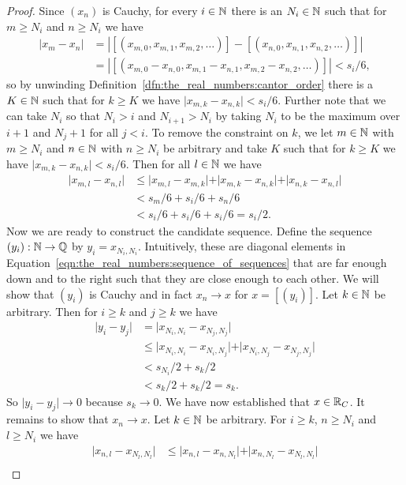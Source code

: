 \documentclass[../main.tex]{subfiles}
\begin{document}
\begin{proof}
    Since $(x_n)$ is Cauchy, for every $i\in\mathbb{N}$ there is an $N_i\in\mathbb{N}$ such that for $m\geq N_i$ and $n\geq N_i$ we have
    \begin{align*}
        \vert x_m-x_n\vert & =\left\vert[(x_{m,0},x_{m,1},x_{m,2},\dots)]-[(x_{n,0},x_{n,1},x_{n,2},\dots)]\right\vert \\
        & =\left\vert[(x_{m,0}-x_{n,0},x_{m,1}-x_{n,1},x_{m,2}-x_{n,2},\dots)]\right\vert<s_i/6,
    \end{align*}
    so by unwinding Definition~\ref{dfn:the_real_numbers:cantor_order} there is a $K\in\mathbb{N}$ such that for $k\geq K$ we have $\vert x_{m,k}-x_{n,k}\vert<s_i/6$. Further note that we can take $N_i$ so that $N_i>i$ and $N_{i+1}>N_i$ by taking $N_i$ to be the maximum over $i+1$ and $N_j+1$ for all $j<i$. To remove the constraint on $k$, we let $m\in\mathbb{N}$ with $m\geq N_i$ and $n\in\mathbb{N}$ with $n\geq N_i$ be arbitrary and take $K$ such that for $k\geq K$ we have $\vert x_{m,k}-x_{n,k}\vert<s_i/6$. Then for all $l\in\mathbb{N}$ we have
    \begin{align*}
        \vert x_{m,l}-x_{n,l}\vert & \leq\vert x_{m,l}-x_{m,k}\vert+\vert x_{m,k}-x_{n,k}\vert+\vert x_{n,k}-x_{n,l}\vert \\
        & <s_m/6+s_i/6+s_n/6 \\
        & <s_i/6+s_i/6+s_i/6=s_i/2.
    \end{align*}
    Now we are ready to construct the candidate sequence. Define the sequence $(y_i):\mathbb{N}\to\mathbb{Q}$ by $y_i=x_{N_i,N_i}$. Intuitively, these are diagonal elements in Equation~\eqref{eqn:the_real_numbers:sequence_of_sequences} that are far enough down and to the right such that they are close enough to each other. We will show that $(y_i)$ is Cauchy and in fact $x_n\to x$ for $x=[(y_i)]$. Let $k\in\mathbb{N}$ be arbitrary. Then for $i\geq k$ and $j\geq k$ we have
    \begin{align*}
        \vert y_i-y_j\vert & =\vert x_{N_i,N_i}-x_{N_j,N_j}\vert \\
        & \leq\vert x_{N_i,N_i}-x_{N_i,N_j}\vert+\vert x_{N_i,N_j}-x_{N_j,N_j}\vert \\
        & <s_{N_i}/2+s_k/2 \\
        & <s_k/2+s_k/2=s_k.
    \end{align*}
    So $\vert y_i-y_j\vert\to0$ because $s_k\to0$. We have now established that $x\in\mathbb{R}_C$. It remains to show that $x_n\to x$. Let $k\in\mathbb{N}$ be arbitrary. For $i\geq k$, $n\geq N_i$ and $l\geq N_i$ we have
    \begin{align*}
        \vert x_{n,l}-x_{N_l,N_l}\vert & \leq\vert x_{n,l}-x_{n,N_l}\vert+\vert x_{n,N_l}-x_{N_l,N_l}\vert \\

\end{align*}
\end{proof}
\end{document}
